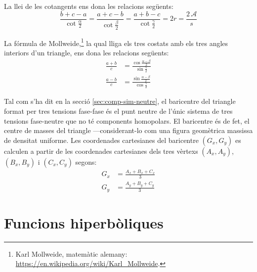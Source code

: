 La llei de les cotangents ens dona les relacions següents:
\begin{equation}
    \frac{b+c-a}{\cot\frac{\alpha}{2}} = \frac{a+c-b}{\cot\frac{\beta}{2}} =
    \frac{a+b-c}{\cot\frac{\gamma}{2}} = 2 r = \frac{2\,\mathscr{A} }{s}
\end{equation}

La fórmula de Mollweide,\footnote{Karl Mollweide, matemàtic alemany: \href{https://en.wikipedia.org/wiki/Karl_Mollweide}{https:/\!\!/en.wikipedia.org/wiki/Karl\_Mollweide}.} la qual lliga els tres costats amb els tres angles interiors d'un triangle, ens dona les relacions següents:
\begin{subequations}
\begin{align}
    \frac{a+b}{c} &= \frac{\cos\frac{\alpha-\beta}{2}}{\sin\frac{\gamma}{2}} \\[1ex]
    \frac{a-b}{c} &= \frac{\sin\frac{\alpha-\beta}{2}}{\cos\frac{\gamma}{2}}
\end{align}
\end{subequations}

Tal com s'ha dit en la secció \vref{sec:comp-sim-neutre}, el baricentre del triangle format per tres tensions fase-fase és el punt neutre de l'únic sistema de tres tensions fase-neutre que no té components homopolars. El baricentre és de fet, el centre de masses del triangle ---considerant-lo com una figura geomètrica massissa de densitat uniforme.  Les coordenades cartesianes del baricentre $(G_x,G_y)$ es calculen a partir de les coordenades cartesianes dels tres vèrtexs $(A_x,A_y)$, $(B_x,B_y)$ i $(C_x,C_y)$ segons:
\begin{subequations}
\begin{align}
    G_x &= \frac{A_x + B_x + C_x}{3} \label{eq:bari_x}\\[1ex]
    G_y &= \frac{A_y + B_y + C_y}{3} \label{eq:bari_y}
\end{align}
\end{subequations}


\section{Funcions hiperbòliques}

